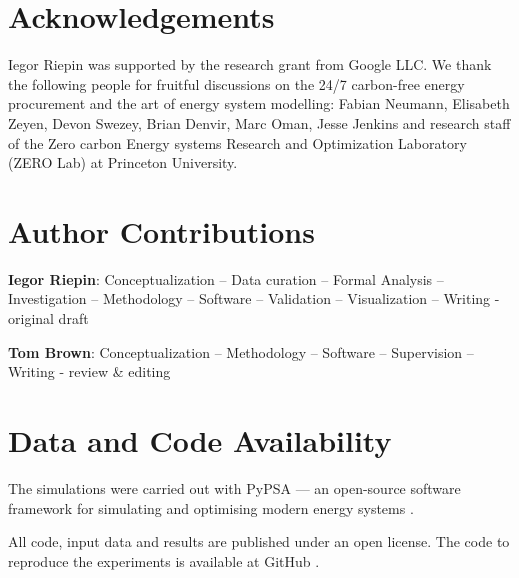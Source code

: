\documentclass[11pt, 5p, nopreprintline]{elsarticle}
\begin{document}
\section*{Acknowledgements}

Iegor Riepin was supported by the research grant from Google LLC. We thank the following people for fruitful discussions on the 24/7 carbon-free energy procurement and the art of energy system modelling: Fabian Neumann, Elisabeth Zeyen, Devon Swezey, Brian Denvir, Marc Oman, Jesse Jenkins and research staff of the Zero carbon Energy systems Research and Optimization Laboratory (ZERO Lab) at Princeton University.

\section*{Author Contributions}


\textbf{Iegor Riepin}:
Conceptualization --
Data curation --
Formal Analysis --
Investigation --
Methodology --
Software --
Validation --
Visualization --
Writing - original draft

\textbf{Tom Brown}:
Conceptualization --
Methodology --
Software --
Supervision --
Writing - review \& editing

\section*{Data and Code Availability}
\label{sec:code}

The simulations were carried out with PyPSA --- an open-source software framework for simulating and optimising modern energy systems \cite{brownPyPSAPythonPower2018}.

All code, input data and results are published under an open license. The code to reproduce the experiments is available at GitHub \cite{github-247CFEpaper}.

\printglossary[type=\acronymtype]

\renewcommand{\ttdefault}{\sfdefault}



\newpage

\makeatletter
\renewcommand \thesection{S\@arabic\c@section}
\renewcommand\thetable{S\@arabic\c@table}
\renewcommand \thefigure{S\@arabic\c@figure}
\makeatother
\renewcommand{\citenumfont}[1]{S#1}
\setcounter{equation}{0}
\setcounter{figure}{0}
\setcounter{table}{0}
\setcounter{section}{0}
\end{document}
